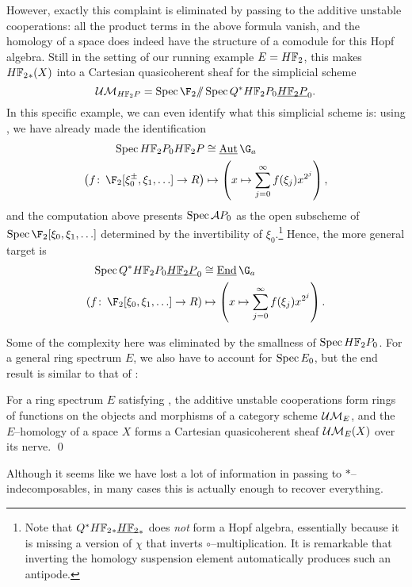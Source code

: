 However, exactly this complaint is eliminated by passing to the additive unstable cooperations: all the product terms in the above formula vanish, and the homology of a space does indeed have the structure of a comodule for this Hopf algebra.  Still in the setting of our running example $E = \HFtwo$, this makes $\HFtwo_*(X)$ into a Cartesian quasicoherent sheaf for the simplicial scheme \[\Ucontext{\HFtwo P} = \Spec \F_2 \mmod \Spec Q^* \HFtwo P_0 \OS{\HFtwo P}{0}.\]  In this specific example, we can even identify what this simplicial scheme is: using , we have already made the identification
\begin{align*}
\Spec \HFtwo P_0 \HFtwo P & \cong \InternalAut{\G_a} \\
\left(f\co \F_2[\xi_0^\pm, \xi_1, \ldots] \to R \right) & \mapsto \left(x \mapsto \sum_{j=0}^\infty f(\xi_j) x^{2^j}\right),
\end{align*}
and the computation above presents $\operatorname{Spec} \mathcal A P_0$ as the open subscheme of $\Spec \F_2[\xi_0, \xi_1, \ldots]$ determined by the invertibility of $\xi_0$.\footnote{Note that $Q^* \HFtwo_* \OS{\HFtwo}{*}$ does \emph{not} form a Hopf algebra, essentially because it is missing a version of $\chi$ that inverts $\circ$--multiplication.  It is remarkable that inverting the homology suspension element automatically produces such an antipode.}  Hence, the more general target is
\begin{align*}
\Spec Q^* \HFtwo P_0 \OS{\HFtwo P}{0} & \cong \InternalEnd{\G_a} \\
\left(f\co \F_2[\xi_0, \xi_1, \ldots] \to R \right) & \mapsto \left(x \mapsto \sum_{j=0}^\infty f(\xi_j) x^{2^j}\right).
\end{align*}

Some of the complexity here was eliminated by the smallness of $\Spec \HFtwo P_0$.  For a general ring spectrum $E$, we also have to account for $\operatorname{Spec} E_0$, but the end result is similar to that of :
\begin{lemma}
For a ring spectrum $E$ satisfying {\UFH}, the additive unstable cooperations form rings of functions on the objects and morphisms of a category scheme $\mathcal{UM}_{E}$, and the $E$--homology of a space $X$ forms a Cartesian quasicoherent sheaf $\mathcal{UM}_{E}(X)$ over its nerve. \qed
\end{lemma}

Although it seems like we have lost a lot of information in passing to $\ast$--indecomposables, in many cases this is actually enough to recover everything.  


